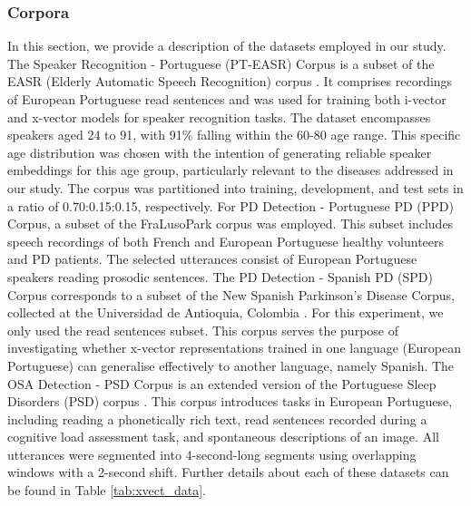 \subsubsection{Corpora}
In this section, we provide a description of the datasets employed in our study.
The Speaker Recognition - Portuguese (PT-EASR) Corpus is a subset of the EASR (Elderly Automatic Speech Recognition) corpus \cite{hamalainen2014easr}. It comprises recordings of European Portuguese read sentences and was used for training both i-vector and x-vector models for speaker recognition tasks. The dataset encompasses speakers aged 24 to 91, with 91\% falling within the 60-80 age range. This specific age distribution was chosen with the intention of generating reliable speaker embeddings for this age group, particularly relevant to the diseases addressed in our study. The corpus was partitioned into training, development, and test sets in a ratio of 0.70:0.15:0.15, respectively.
For \ac{PD} Detection - Portuguese \ac{PD} (PPD) Corpus, a subset of the FraLusoPark corpus \cite{pinto2016dysarthria} was employed. This subset includes speech recordings of both French and European Portuguese healthy volunteers and \ac{PD} patients. The selected utterances consist of European Portuguese speakers reading prosodic sentences.
The \ac{PD} Detection - Spanish \ac{PD} (SPD) Corpus corresponds to a subset of the New Spanish Parkinson’s Disease Corpus, collected at the Universidad de Antioquia, Colombia \cite{orozco2014new}. For this experiment, we only used the read sentences subset. This corpus serves the purpose of investigating whether x-vector representations trained in one language (European Portuguese) can generalise effectively to another language, namely Spanish.
The \ac{OSA} Detection - PSD Corpus is an extended version of the Portuguese Sleep Disorders (PSD) corpus \cite{botelho2019speech}. This corpus introduces tasks in European Portuguese, including reading a phonetically rich text, read sentences recorded during a cognitive load assessment task, and spontaneous descriptions of an image. All utterances were segmented into 4-second-long segments using overlapping windows with a 2-second shift. Further details about each of these datasets can be found in Table \ref{tab:xvect_data}.
